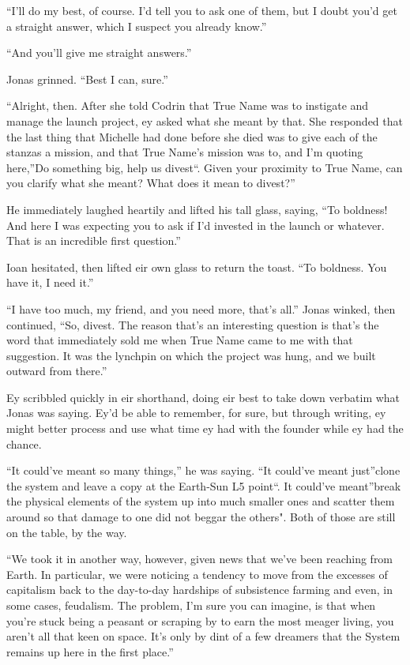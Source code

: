 ``I'll do my best, of course. I'd tell you to ask one of them, but I doubt you'd get a straight answer, which I suspect you already know.''

``And you'll give me straight answers.''

Jonas grinned. ``Best I can, sure.''

``Alright, then. After she told Codrin that True Name was to instigate and manage the launch project, ey asked what she meant by that. She responded that the last thing that Michelle had done before she died was to give each of the stanzas a mission, and that True Name's mission was to, and I'm quoting here,''Do something big, help us divest``. Given your proximity to True Name, can you clarify what she meant? What does it mean to divest?''

He immediately laughed heartily and lifted his tall glass, saying, ``To boldness! And here I was expecting you to ask if I'd invested in the launch or whatever. That is an incredible first question.''

Ioan hesitated, then lifted eir own glass to return the toast. ``To boldness. You have it, I need it.''

``I have too much, my friend, and you need more, that's all.'' Jonas winked, then continued, ``So, divest. The reason that's an interesting question is that's the word that immediately sold me when True Name came to me with that suggestion. It was the lynchpin on which the project was hung, and we built outward from there.''

Ey scribbled quickly in eir shorthand, doing eir best to take down verbatim what Jonas was saying. Ey'd be able to remember, for sure, but through writing, ey might better process and use what time ey had with the founder while ey had the chance.

``It could've meant so many things,'' he was saying. ``It could've meant just''clone the system and leave a copy at the Earth-Sun L5 point``. It could've meant''break the physical elements of the system up into much smaller ones and scatter them around so that damage to one did not beggar the others". Both of those are still on the table, by the way.

``We took it in another way, however, given news that we've been reaching from Earth. In particular, we were noticing a tendency to move from the excesses of capitalism back to the day-to-day hardships of subsistence farming and even, in some cases, feudalism. The problem, I'm sure you can imagine, is that when you're stuck being a peasant or scraping by to earn the most meager living, you aren't all that keen on space. It's only by dint of a few dreamers that the System remains up here in the first place.''

